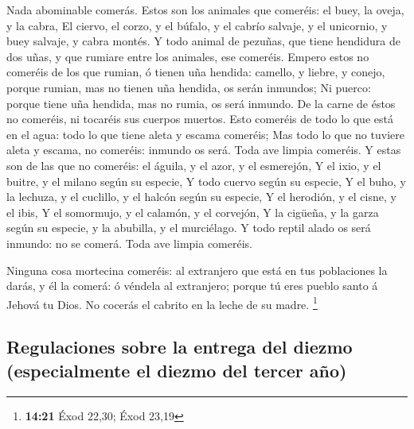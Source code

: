  Nada abominable comerás.  Estos son los
animales que comeréis: el buey, la oveja, y la cabra,  El
ciervo, el corzo, y el búfalo, y el cabrío salvaje, y el unicornio, y
buey salvaje, y cabra montés.  Y todo animal de pezuñas,
que tiene hendidura de dos uñas, y que rumiare entre los animales, ese
comeréis.  Empero estos no comeréis de los que rumian, ó
tienen uña hendida: camello, y liebre, y conejo, porque rumian, mas no
tienen uña hendida, os serán inmundos;  Ni puerco: porque
tiene uña hendida, mas no rumia, os será inmundo. De la carne de éstos
no comeréis, ni tocaréis sus cuerpos muertos.  Esto
comeréis de todo lo que está en el agua: todo lo que tiene aleta y
escama comeréis;  Mas todo lo que no tuviere aleta y
escama, no comeréis: inmundo os será.  Toda ave limpia
comeréis.  Y estas son de las que no comeréis: el águila,
y el azor, y el esmerejón,  Y el ixio, y el buitre, y el
milano según su especie,  Y todo cuervo según su especie,
 Y el buho, y la lechuza, y el cuclillo, y el halcón
según su especie,  Y el herodión, y el cisne, y el ibis,
 Y el somormujo, y el calamón, y el corvejón,
 Y la cigüeña, y la garza según su especie, y la
abubilla, y el murciélago.  Y todo reptil alado os será
inmundo: no se comerá.  Toda ave limpia comeréis.

 Ninguna cosa mortecina comeréis: al extranjero que está
en tus poblaciones la darás, y él la comerá: ó véndela al extranjero;
porque tú eres pueblo santo á Jehová tu Dios. No cocerás el cabrito en
la leche de su madre. \footnote{\textbf{14:21} Éxod 22,30; Éxod 23,19}

\hypertarget{regulaciones-sobre-la-entrega-del-diezmo-especialmente-el-diezmo-del-tercer-auxf1o}{%
\subsection{Regulaciones sobre la entrega del diezmo (especialmente el
diezmo del tercer
año)}\label{regulaciones-sobre-la-entrega-del-diezmo-especialmente-el-diezmo-del-tercer-auxf1o}}

